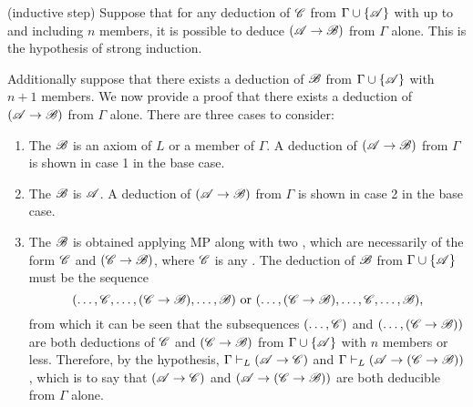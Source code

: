 \begin{proposition}
  (inductive step) Suppose that for any deduction of \(\mathscr{C}\) from \(\Gamma \cup \{\mathscr{A}\}\) with up to and including \(n\) members, it is possible to deduce \((\mathscr{A} \rightarrow \mathscr{B})\) from \(\Gamma\) alone. This is the hypothesis of strong induction.

  Additionally suppose that there exists a deduction of \(\mathscr{B}\) from \(\Gamma \cup \{\mathscr{A}\}\) with \(n + 1\) members. We now provide a proof that there exists a deduction of \((\mathscr{A} \rightarrow \mathscr{B})\) from \(\Gamma\) alone. There are three cases to consider:

  \begin{enumerate}
    \item The \wf{} \(\mathscr{B}\) is an axiom of \(L\) or a member of \(\Gamma\). A deduction of \((\mathscr{A} \rightarrow \mathscr{B})\) from \(\Gamma\) is shown in case 1 in the base case.

    \item The \wf{} \(\mathscr{B}\) is \(\mathscr{A}\). A deduction of \((\mathscr{A} \rightarrow \mathscr{B})\) from \(\Gamma\) is shown in case 2 in the base case.

    \item The \wf{} \(\mathscr{B}\) is obtained applying MP along with two \wfs{}, which are necessarily of the form \(\mathscr{C}\) and \((\mathscr{C} \rightarrow \mathscr{B})\), where \(\mathscr{C}\) is any \wf{}. The deduction of \(\mathscr{B}\) from \(\Gamma \cup \{\mathscr{A}\}\) must be the sequence
      \[(\dots, \mathscr{C}, \dots, (\mathscr{C} \rightarrow \mathscr{B}), \dots, \mathscr{B}) \text{ or } (\dots, (\mathscr{C} \rightarrow \mathscr{B}), \dots, \mathscr{C}, \dots, \mathscr{B}),\]
    from which it can be seen that the subsequences \((\dots, \mathscr{C})\) and \((\dots, (\mathscr{C} \rightarrow \mathscr{B}))\) are both deductions of \(\mathscr{C}\) and \((\mathscr{C} \rightarrow \mathscr{B})\) from \(\Gamma \cup \{\mathscr{A}\}\) with \(n\) members or less. Therefore, by the hypothesis, \(\Gamma \vdash_{L} (\mathscr{A} \rightarrow \mathscr{C})\) and \(\Gamma \vdash_{L} (\mathscr{A} \rightarrow (\mathscr{C} \rightarrow \mathscr{B}))\), which is to say that \((\mathscr{A} \rightarrow \mathscr{C})\) and \((\mathscr{A} \rightarrow (\mathscr{C} \rightarrow \mathscr{B}))\) are both deducible from \(\Gamma\) alone.


\end{enumerate}
\end{proposition}

